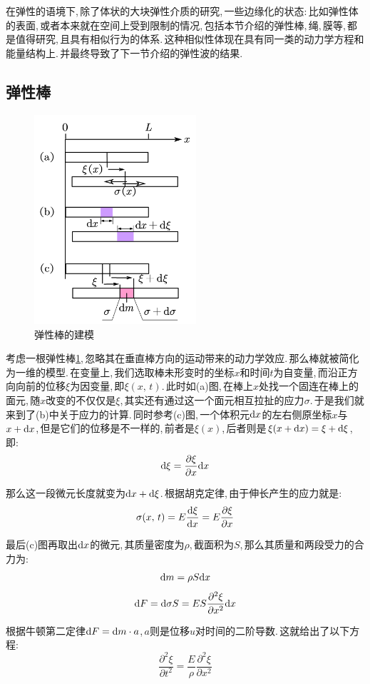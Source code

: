 在弹性的语境下,\,除了体状的大块弹性介质的研究,\,一些边缘化的状态:\,比如弹性体的表面,\,或者本来就在空间上受到限制的情况,\,包括本节介绍的弹性棒,\,绳,\,膜等,\,都是值得研究,\,且具有相似行为的体系.\,这种相似性体现在具有同一类的动力学方程和能量结构上.\,并最终导致了下一节介绍的弹性波的结果.

\subsection{弹性棒}

\begin{figure}
\centering
\includegraphics[width=6cm]{image/6-7-4.png}
\caption{弹性棒的建模}\label{6-7-4}
\end{figure}
考虑一根弹性棒\ref{6-7-4},\,忽略其在垂直棒方向的运动带来的动力学效应.\,那么棒就被简化为一维的模型.\,在变量上,\,我们选取棒未形变时的坐标$x$和时间$t$为自变量,\,而沿正方向向前的位移$\xi$为因变量,\,即$\xi(x,\,t)$.\,此时如(a)图,\,在棒上$x$处找一个固连在棒上的面元,\,随$x$改变的不仅仅是$\xi$,\,其实还有通过这一个面元相互拉扯的应力$\sigma$.\,于是我们就来到了(b)中关于应力的计算.\,同时参考(c)图,\,一个体积元$\textrm{d} x$的左右侧原坐标$x$与$x+\textrm{d} x$,\,但是它们的位移是不一样的,\,前者是$\xi(x)$,\,后者则是$\xi(x+\textrm{d} x)=\xi+\textrm{d} \xi$,\,即:
\[\textrm{d} \xi=\frac{\partial \xi}{\partial x}\textrm{d} x\]

那么这一段微元长度就变为$\textrm{d} x+\textrm{d} \xi$.\,根据胡克定律,\,由于伸长产生的应力就是:
\[\sigma(x,\,t)=E\frac{\textrm{d} \xi}{\textrm{d} x}=E\frac{\partial \xi}{\partial x}\]

最后(c)图再取出$\textrm{d} x$的微元,\,其质量密度为$\rho$,\,截面积为$S$,\,那么其质量和两段受力的合力为:
\[\textrm{d} m=\rho S\textrm{d} x\]
\[\textrm{d} F=\textrm{d} \sigma S=ES\frac{\partial^2 \xi}{\partial x^2}\textrm{d} x\]

根据牛顿第二定律$\textrm{d} F=\textrm{d} m \cdot a$,\,$a$则是位移$u$对时间的二阶导数.\,这就给出了以下方程:
\[\frac{\partial^2 \xi}{\partial t^2}=\frac{E}{\rho} \frac{\partial^2 \xi}{\partial x^2}\]

